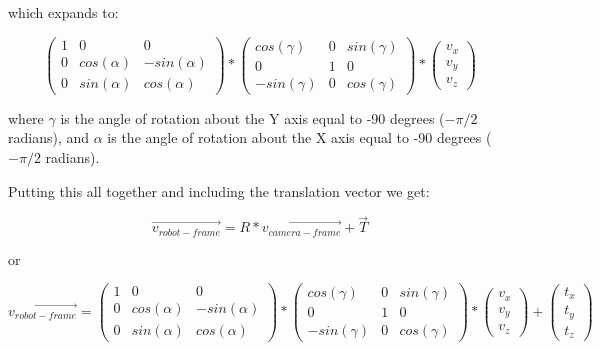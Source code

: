 \documentclass[11pt]{article}
\begin{document}
which expands to:

\begin{equation}
    \begin{pmatrix}
        1 & 0 & 0 \\
        0 & cos(\alpha) & -sin(\alpha) \\
        0 & sin(\alpha) & cos(\alpha)
    \end{pmatrix}
    *
    \begin{pmatrix}
        cos(\gamma) & 0 & sin(\gamma) \\
        0 & 1 & 0 \\
        -sin(\gamma) & 0 & cos(\gamma)
    \end{pmatrix}
    * 
    \begin{pmatrix}
        v_x \\
        v_y \\
        v_z
    \end{pmatrix}
\end{equation}

where $\gamma$ is the angle of rotation about the Y axis equal to -90 degrees ($-\pi/2$ radians), 
and $\alpha$ is the angle of rotation about the X axis equal to -90 degrees ($-\pi/2$ radians).

Putting this all together and including the translation vector we get:

\begin{equation}
    \vec{v_{robot-frame}} = R * \vec{v_{camera-frame}} + \vec{T}
\end{equation}

or

\begin{equation}
    \vec{v_{robot-frame}} = 
    \begin{pmatrix}
        1 & 0 & 0 \\
        0 & cos(\alpha) & -sin(\alpha) \\
        0 & sin(\alpha) & cos(\alpha)
    \end{pmatrix}
    *
    \begin{pmatrix}
        cos(\gamma) & 0 & sin(\gamma) \\
        0 & 1 & 0 \\
        -sin(\gamma) & 0 & cos(\gamma)
    \end{pmatrix}
    * 
    \begin{pmatrix}
        v_x \\
        v_y \\
        v_z
    \end{pmatrix}
    +
    \begin{pmatrix}
        t_x \\
        t_y \\        
        t_z
    \end{pmatrix}
\end{equation}
\end{document}
